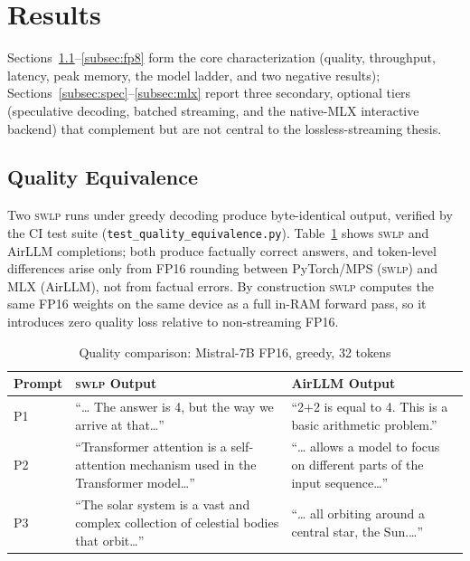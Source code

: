 \documentclass[10pt,a4paper]{article}
\newcommand{\swlp}{\textsc{swlp}}
\begin{document}
\section{Results}
\label{sec:results}

Sections~\ref{subsec:quality}--\ref{subsec:fp8} form the core characterization
(quality, throughput, latency, peak memory, the model ladder, and two negative
results); Sections~\ref{subsec:spec}--\ref{subsec:mlx} report three secondary,
optional tiers (speculative decoding, batched streaming, and the native-MLX
interactive backend) that complement but are not central to the lossless-streaming
thesis.

\subsection{Quality Equivalence}
\label{subsec:quality}

Two \swlp{} runs under greedy decoding produce byte-identical output, verified by
the CI test suite (\texttt{test\_quality\_equivalence.py}). Table~\ref{tab:quality}
shows \swlp{} and AirLLM completions; both produce factually correct answers, and
token-level differences arise only from FP16 rounding between PyTorch/MPS (\swlp{})
and MLX (AirLLM), not from factual errors. By construction \swlp{} computes the
same FP16 weights on the same device as a full in-RAM forward pass, so it
introduces zero quality loss relative to non-streaming FP16.

\begin{table}[htbp]
\centering
\caption{Quality comparison: Mistral-7B FP16, greedy, 32 tokens}
\label{tab:quality}
\small
\begin{tabular}{@{}p{1.2cm}p{5.3cm}p{5.3cm}@{}}
\toprule
\textbf{Prompt} & \textbf{\swlp{} Output} & \textbf{AirLLM Output} \\
\midrule
P1 & ``\ldots{} The answer is 4, but the way we arrive at that\ldots'' & ``2+2 is equal to 4. This is a basic arithmetic problem.'' \\
P2 & ``Transformer attention is a self-attention mechanism used in the Transformer model\ldots'' & ``\ldots{} allows a model to focus on different parts of the input sequence\ldots'' \\
P3 & ``The solar system is a vast and complex collection of celestial bodies that orbit\ldots'' & ``\ldots{} all orbiting around a central star, the Sun.\ldots'' \\
\bottomrule
\end{tabular}
\end{table}
\end{document}
